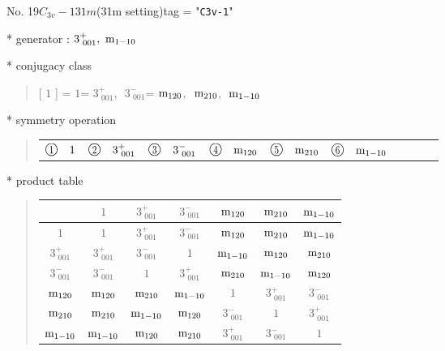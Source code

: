 \documentclass[fleqn,10pt,landscape]{jsarticle}
\begin{document}
\newpage

No. 19\quad$C_{3v}-1$\quad$31m$\quad(31m setting)\quad[ trigonal ]
tag = "{\tt C3v-1}"

* generator : $3^{+}_{\,\,001},\,\,{\rm m}_{1-10}$

* conjugacy class
\begin{quote}
[ $1$ ] = \quad $1$\newline[ $3^{+}_{\,\,001}$ ] = \quad $3^{+}_{\,\,001}$,\,\, $3^{-}_{\,\,001}$\newline[ ${\rm m}_{120}$ ] = \quad ${\rm m}_{120}$,\,\, ${\rm m}_{210}$,\,\, ${\rm m}_{1-10}$\newline
\end{quote}

* symmetry operation
\begin{quote}
\begin{tabular}{llllllllll}
$ {\ooalign{\hfil\resizebox{.8\width}{\height}{1}\hfil\crcr\raise.1ex\hbox{\large$\bigcirc$}}}\quad 1 $ & $ {\ooalign{\hfil\resizebox{.8\width}{\height}{2}\hfil\crcr\raise.1ex\hbox{\large$\bigcirc$}}}\quad 3^{+}_{\,\,001} $ & $ {\ooalign{\hfil\resizebox{.8\width}{\height}{3}\hfil\crcr\raise.1ex\hbox{\large$\bigcirc$}}}\quad 3^{-}_{\,\,001} $ & $ {\ooalign{\hfil\resizebox{.8\width}{\height}{4}\hfil\crcr\raise.1ex\hbox{\large$\bigcirc$}}}\quad {\rm m}_{120} $ & $ {\ooalign{\hfil\resizebox{.8\width}{\height}{5}\hfil\crcr\raise.1ex\hbox{\large$\bigcirc$}}}\quad {\rm m}_{210} $ & $ {\ooalign{\hfil\resizebox{.8\width}{\height}{6}\hfil\crcr\raise.1ex\hbox{\large$\bigcirc$}}}\quad {\rm m}_{1-10} $
\end{tabular}
\end{quote}

* product table
\begin{quote}
\begin{tabular}{ccccccc} \hline \hline
 & $ 1 $ & $ 3^{+}_{\,\,001} $ & $ 3^{-}_{\,\,001} $ & $ {\rm m}_{120} $ & $ {\rm m}_{210} $ & $ {\rm m}_{1-10} $ \\ \hline
$ 1 $ & $ 1 $ & $ 3^{+}_{\,\,001} $ & $ 3^{-}_{\,\,001} $ & $ {\rm m}_{120} $ & $ {\rm m}_{210} $ & $ {\rm m}_{1-10} $ \\
$ 3^{+}_{\,\,001} $ & $ 3^{+}_{\,\,001} $ & $ 3^{-}_{\,\,001} $ & $ 1 $ & $ {\rm m}_{1-10} $ & $ {\rm m}_{120} $ & $ {\rm m}_{210} $ \\
$ 3^{-}_{\,\,001} $ & $ 3^{-}_{\,\,001} $ & $ 1 $ & $ 3^{+}_{\,\,001} $ & $ {\rm m}_{210} $ & $ {\rm m}_{1-10} $ & $ {\rm m}_{120} $ \\
$ {\rm m}_{120} $ & $ {\rm m}_{120} $ & $ {\rm m}_{210} $ & $ {\rm m}_{1-10} $ & $ 1 $ & $ 3^{+}_{\,\,001} $ & $ 3^{-}_{\,\,001} $ \\
$ {\rm m}_{210} $ & $ {\rm m}_{210} $ & $ {\rm m}_{1-10} $ & $ {\rm m}_{120} $ & $ 3^{-}_{\,\,001} $ & $ 1 $ & $ 3^{+}_{\,\,001} $ \\
$ {\rm m}_{1-10} $ & $ {\rm m}_{1-10} $ & $ {\rm m}_{120} $ & $ {\rm m}_{210} $ & $ 3^{+}_{\,\,001} $ & $ 3^{-}_{\,\,001} $ & $ 1 $ \\
 \hline \hline
\end{tabular}
\end{quote}
\end{document}
